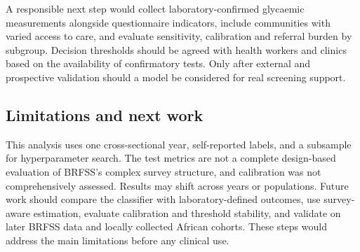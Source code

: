 A responsible next step would collect laboratory-confirmed glycaemic measurements alongside questionnaire indicators, include communities with varied access to care, and evaluate sensitivity, calibration and referral burden by subgroup. Decision thresholds should be agreed with health workers and clinics based on the availability of confirmatory tests. Only after external and prospective validation should a model be considered for real screening support.

\subsection{Limitations and next work}
This analysis uses one cross-sectional year, self-reported labels, and a subsample for hyperparameter search. The test metrics are not a complete design-based evaluation of BRFSS's complex survey structure, and calibration was not comprehensively assessed. Results may shift across years or populations. Future work should compare the classifier with laboratory-defined outcomes, use survey-aware estimation, evaluate calibration and threshold stability, and validate on later BRFSS data and locally collected African cohorts. These steps would address the main limitations before any clinical use.
